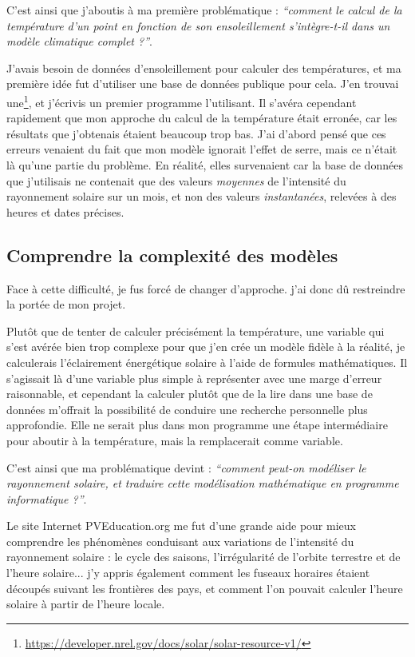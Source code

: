 \documentclass[12pt,a4paper]{article}
\begin{document}
C'est ainsi que j'aboutis à ma première problématique : \emph{``comment le calcul de la température d'un point en fonction de son ensoleillement s'intègre-t-il dans un modèle climatique complet ?''}.

J'avais besoin de données d'ensoleillement pour calculer des températures, et ma première idée fut d'utiliser une base de données publique pour cela.
J'en trouvai une\footnote{\url{https://developer.nrel.gov/docs/solar/solar-resource-v1/}}, et j'écrivis un premier programme l'utilisant.
Il s'avéra cependant rapidement que mon approche du calcul de la température était erronée, car les résultats que j'obtenais étaient beaucoup trop bas.
J'ai d'abord pensé que ces erreurs venaient du fait que mon modèle ignorait l'effet de serre, mais ce n'était là qu'une partie du problème.
En réalité, elles survenaient car la base de données que j'utilisais ne contenait que des valeurs \emph{moyennes} de l'intensité du rayonnement solaire sur un mois, et non des valeurs \emph{instantanées}, relevées à des heures et dates précises.

\subsection{Comprendre la complexité des modèles}
Face à cette difficulté, je fus forcé de changer d'approche.
j'ai donc dû restreindre la portée de mon projet.

Plutôt que de tenter de calculer précisément la température, une variable qui s'est avérée bien trop complexe pour que j'en crée un modèle fidèle à la réalité, je calculerais l'éclairement énergétique solaire à l'aide de formules mathématiques.
Il s'agissait là d'une variable plus simple à représenter avec une marge d'erreur raisonnable, et cependant la calculer plutôt que de la lire dans une base de données m'offrait la possibilité de conduire une recherche personnelle plus approfondie.
Elle ne serait plus dans mon programme une étape intermédiaire pour aboutir à la température, mais la remplacerait comme variable.

C'est ainsi que ma problématique devint : \emph{``comment peut-on modéliser le rayonnement solaire, et traduire cette modélisation mathématique en programme informatique ?''}.

Le site Internet PVEducation.org me fut d'une grande aide pour mieux comprendre les phénomènes conduisant aux variations de l'intensité du rayonnement solaire : le cycle des saisons, l'irrégularité de l'orbite terrestre et de l'heure solaire... j'y appris également comment les fuseaux horaires étaient découpés suivant les frontières des pays, et comment l'on pouvait calculer l'heure solaire à partir de l'heure locale.
\end{document}
